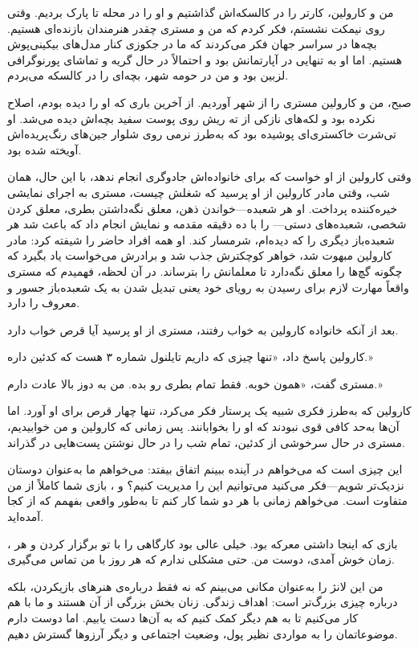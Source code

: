 
من و کارولین، کارتر را در کالسکه‌اش گذاشتیم و او را در محله تا پارک بردیم. وقتی روی نیمکت نشستم، فکر کردم که من و مستری چقدر هنرمندان بازنده‌ای هستیم. بچه‌ها در سراسر جهان فکر می‌کردند که ما در جکوزی کنار مدل‌های بیکینی‌پوش هستیم. اما او به تنهایی در آپارتمانش بود و احتمالاً در حال گریه و تماشای پورنوگرافی لزبین بود و من در حومه شهر، بچه‌ای را در کالسکه می‌بردم.

صبح، من و کارولین مستری را از شهر آوردیم. از آخرین باری که او را دیده بودم، اصلاح نکرده بود و لکه‌های نازکی از ته ریش روی پوست سفید بچه‌اش دیده می‌شد. او تی‌شرت خاکستری‌ای پوشیده بود که به‌طرز نرمی روی شلوار جین‌های رنگ‌پریده‌اش آویخته شده بود.

وقتی کارولین از او خواست که برای خانواده‌اش جادوگری انجام ندهد، با این حال، همان شب، وقتی مادر کارولین از او پرسید که شغلش چیست، مستری به اجرای نمایشی خیره‌کننده پرداخت. او هر شعبده‌—خواندن ذهن، معلق نگه‌داشتن بطری، معلق کردن شخصی، شعبده‌های دستی— را با ده دقیقه مقدمه و نمایش انجام داد که باعث شد هر شعبده‌باز دیگری را که دیده‌ام، شرمسار کند. او همه افراد حاضر را شیفته کرد: مادر کارولین مبهوت شد، خواهر کوچکترش جذب شد و برادرش می‌خواست یاد بگیرد که چگونه گچ‌ها را معلق نگه‌دارد تا معلمانش را بترساند. در آن لحظه، فهمیدم که مستری واقعاً مهارت لازم برای رسیدن به رویای خود یعنی تبدیل شدن به یک شعبده‌باز جسور و معروف را دارد.

بعد از آنکه خانواده کارولین به خواب رفتند، مستری از او پرسید آیا قرص خواب دارد.

کارولین پاسخ داد، «تنها چیزی که داریم تایلنول شماره ۳ هست که کدئین داره.»

مستری گفت، «همون خوبه. فقط تمام بطری رو بده. من به دوز بالا عادت دارم.»

کارولین که به‌طرز فکری شبیه یک پرستار فکر می‌کرد، تنها چهار قرص برای او آورد. اما آن‌ها به‌حد کافی قوی نبودند که او را بخوابانند. پس زمانی که کارولین و من خوابیدیم، مستری در حال سرخوشی از کدئین، تمام شب را در حال نوشتن پست‌هایی در  گذراند.

این چیزی است که می‌خواهم در آینده ببینم اتفاق بیفتد: می‌خواهم ما به‌عنوان دوستان نزدیک‌تر شویم—فکر می‌کنید می‌توانیم این را مدیریت کنیم؟  و ، بازی شما کاملاً از من متفاوت است. می‌خواهم زمانی با هر دو شما کار کنم تا به‌طور واقعی بفهمم که از کجا آمده‌اید.

، بازی که اینجا داشتی معرکه بود. خیلی عالی بود کارگاهی را با تو برگزار کردن و هر زمان خوش آمدی، دوست من. حتی مشکلی ندارم که هر روز با من تماس می‌گیری.

من این لانژ را به‌عنوان مکانی می‌بینم که نه فقط درباره‌ی هنرهای بازیکردن، بلکه درباره چیزی بزرگ‌تر است: اهداف زندگی. زنان بخش بزرگی از آن هستند و ما با هم کار می‌کنیم تا به هم دیگر کمک کنیم که به آن‌ها دست یابیم. اما دوست دارم موضوعاتمان را به مواردی نظیر پول، وضعیت اجتماعی و دیگر آرزوها گسترش دهیم.